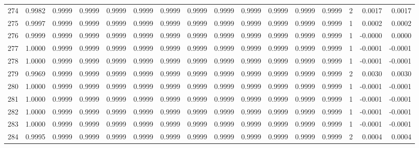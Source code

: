\begin{tabular}{lrrrrrrrrrrrrrrr}
274 &      0.9982 &  0.9999 &  0.9999 &  0.9999 &  0.9999 &  0.9999 &  0.9999 &  0.9999 &  0.9999 &  0.9999 &   0.9999 &     0.9999 &      2 &                    0.0017 &                     0.0017 \\
275 &      0.9997 &  0.9999 &  0.9999 &  0.9999 &  0.9999 &  0.9999 &  0.9999 &  0.9999 &  0.9999 &  0.9999 &   0.9999 &     0.9999 &      1 &                    0.0002 &                     0.0002 \\
276 &      0.9999 &  0.9999 &  0.9999 &  0.9999 &  0.9999 &  0.9999 &  0.9999 &  0.9999 &  0.9999 &  0.9999 &   0.9999 &     0.9999 &      1 &                   -0.0000 &                     0.0000 \\
277 &      1.0000 &  0.9999 &  0.9999 &  0.9999 &  0.9999 &  0.9999 &  0.9999 &  0.9999 &  0.9999 &  0.9999 &   0.9999 &     0.9999 &      1 &                   -0.0001 &                    -0.0001 \\
278 &      1.0000 &  0.9999 &  0.9999 &  0.9999 &  0.9999 &  0.9999 &  0.9999 &  0.9999 &  0.9999 &  0.9999 &   0.9999 &     0.9999 &      1 &                   -0.0001 &                    -0.0001 \\
279 &      0.9969 &  0.9999 &  0.9999 &  0.9999 &  0.9999 &  0.9999 &  0.9999 &  0.9999 &  0.9999 &  0.9999 &   0.9999 &     0.9999 &      2 &                    0.0030 &                     0.0030 \\
280 &      1.0000 &  0.9999 &  0.9999 &  0.9999 &  0.9999 &  0.9999 &  0.9999 &  0.9999 &  0.9999 &  0.9999 &   0.9999 &     0.9999 &      1 &                   -0.0001 &                    -0.0001 \\
281 &      1.0000 &  0.9999 &  0.9999 &  0.9999 &  0.9999 &  0.9999 &  0.9999 &  0.9999 &  0.9999 &  0.9999 &   0.9999 &     0.9999 &      1 &                   -0.0001 &                    -0.0001 \\
282 &      1.0000 &  0.9999 &  0.9999 &  0.9999 &  0.9999 &  0.9999 &  0.9999 &  0.9999 &  0.9999 &  0.9999 &   0.9999 &     0.9999 &      1 &                   -0.0001 &                    -0.0001 \\
283 &      1.0000 &  0.9999 &  0.9999 &  0.9999 &  0.9999 &  0.9999 &  0.9999 &  0.9999 &  0.9999 &  0.9999 &   0.9999 &     0.9999 &      1 &                   -0.0001 &                    -0.0001 \\
284 &      0.9995 &  0.9999 &  0.9999 &  0.9999 &  0.9999 &  0.9999 &  0.9999 &  0.9999 &  0.9999 &  0.9999 &   0.9999 &     0.9999 &      2 &                    0.0004 &                     0.0004 \\

\end{tabular}
